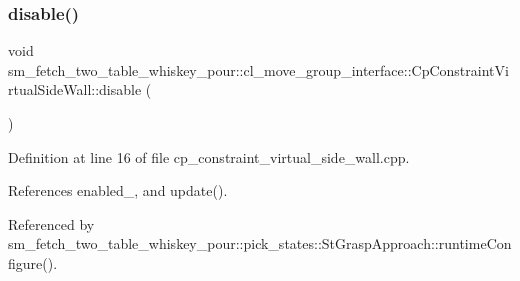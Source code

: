 \subsubsection{\texorpdfstring{disable()}{disable()}\hspace{0.1cm}{\footnotesize\ttfamily [2/2]}}
{\footnotesize\ttfamily void sm\+\_\+fetch\+\_\+two\+\_\+table\+\_\+whiskey\+\_\+pour\+::cl\+\_\+move\+\_\+group\+\_\+interface\+::\+Cp\+Constraint\+Virtual\+Side\+Wall\+::disable (\begin{DoxyParamCaption}{ }\end{DoxyParamCaption})}



Definition at line 16 of file cp\+\_\+constraint\+\_\+virtual\+\_\+side\+\_\+wall.\+cpp.



References enabled\+\_\+, and update().



Referenced by sm\+\_\+fetch\+\_\+two\+\_\+table\+\_\+whiskey\+\_\+pour\+::pick\+\_\+states\+::\+St\+Grasp\+Approach\+::runtime\+Configure().


